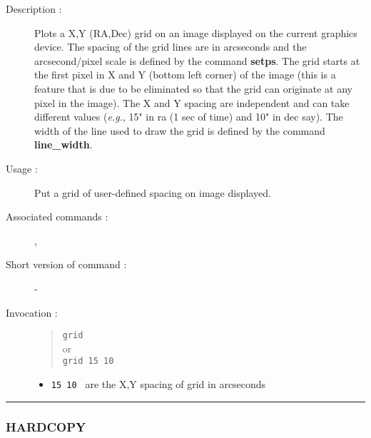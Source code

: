 \begin{description}

\item[Description :] Plots a X,Y (RA,Dec) grid on an image displayed on
the current graphics device.  The spacing of the grid lines are in
arcseconds and the arcsecond/pixel scale is defined by the command
{\bf setps}.  The grid starts at the first pixel in X and Y (bottom left
corner) of the image (this is a feature that is due to be eliminated so
that the grid can originate at any pixel in the image).  The X and Y
spacing are independent and can take different values (\emph{e.g.}, 15"
in ra (1 sec of time) and 10" in dec say).  The width of the line used
to draw the grid is defined by the command {\bf line\_width}.

\item[Usage :] Put a grid of user-defined spacing on image displayed.
\item[Associated commands :] {\tt {}},
{\tt {}}
\item[Short version of command :] -
\item[Invocation :]

\begin{quote}{\tt  grid }\\
or \\
{\tt grid 15 10 }
\end{quote}

\begin{itemize}

\item {\tt 15 10 } are the X,Y spacing of grid in arcseconds
\end{itemize}

\end{description}

\hrule
\subsubsection*{\label{HARDCOPY}HARDCOPY}

